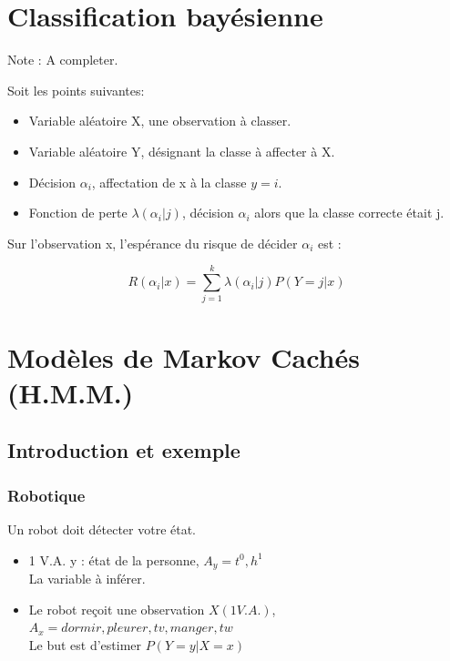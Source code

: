 \documentclass{article}
\begin{document}
\section{Classification bayésienne}

Note : A completer.

Soit les points suivantes:

\begin{itemize}
\item Variable aléatoire X, une observation à classer.
\item Variable aléatoire Y, désignant la classe à affecter à X.
\item Décision $\alpha_i$, affectation de x à la classe $y = i$.
\item Fonction de perte $\lambda(\alpha_i | j)$, décision $\alpha_i$ alors que la classe correcte était j.
\end{itemize}

Sur l'observation x, l'espérance du risque de décider $\alpha_i$ est : 

\[ R(\alpha_i | x) = \sum_{j = 1}^{k} \lambda(\alpha_i | j) P(Y = j | x) \]

\section{Modèles de Markov Cachés (H.M.M.)}

\subsection{Introduction et exemple}

\subsubsection{Robotique} 

Un robot doit détecter votre état. 
\begin{itemize}

\item 1 V.A. y : état de la personne, $A_y = {t^0, h^1}$ \\
      La variable à inférer.

\item Le robot reçoit une observation $X(1 V.A.)$, $A_x = {dormir, pleurer, tv, manger, tw}$\\
      Le but est d'estimer $P(Y = y | X = x)$

\end{itemize}
\end{document}
